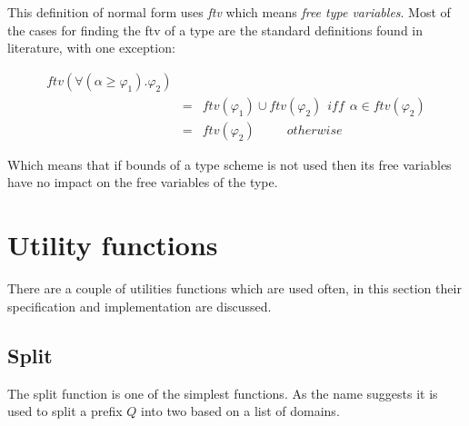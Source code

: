 This definition of normal form uses \emph{ftv} which means \emph{free type variables}. Most of the cases for finding the ftv of a type are the standard definitions found in literature, with one exception:

\begin{eqnarray*}
ftv(\forall(\alpha \geq \varphi_1).\varphi_2)\\
  \hspace{15pt} & = & ftv(\varphi_1)\cup ftv(\varphi_2) \hspace{5pt} iff \hspace{5pt} \alpha \in ftv(\varphi_2) \\
  \hspace{15pt} & = & ftv(\varphi_2) \hspace{30pt} otherwise
\end{eqnarray*}

Which means that if bounds of a type scheme is not used then its free variables have no impact on the free variables of the type.
\section{Utility functions}
There are a couple of utilities functions which are used often, in this section their specification and implementation are discussed.
\subsection{Split}
The split function is one of the simplest functions. As the name suggests it is used to split a prefix $Q$ into two based on a list of domains.

